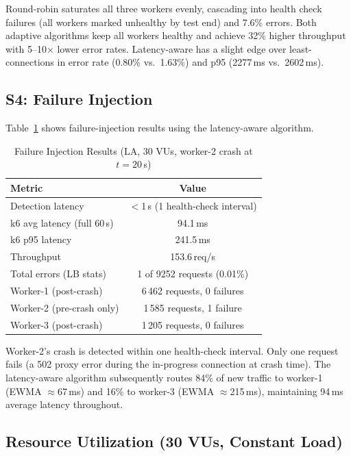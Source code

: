 \documentclass[conference]{IEEEtran}
\begin{document}
Round-robin saturates all three workers evenly, cascading into health
check failures (all workers marked unhealthy by test end) and 7.6\%
errors. Both adaptive algorithms keep all workers healthy and achieve
32\% higher throughput with 5--10$\times$ lower error rates. Latency-aware
has a slight edge over least-connections in error rate (0.80\% vs.\
1.63\%) and p95 (2277\,ms vs.\ 2602\,ms).

\subsection{S4: Failure Injection}

Table~\ref{tab:failure} shows failure-injection results using the
latency-aware algorithm.

\begin{table}[h]
\caption{Failure Injection Results (LA, 30 VUs, worker-2 crash at $t{=}20$\,s)}
\label{tab:failure}
\centering
\begin{tabular}{@{}lc@{}}
\toprule
Metric & Value \\
\midrule
Detection latency            & $<$1\,s (1 health-check interval) \\
k6 avg latency (full 60\,s)  & 94.1\,ms \\
k6 p95 latency               & 241.5\,ms \\
Throughput                   & 153.6\,req/s \\
Total errors (LB stats)      & 1 of 9252 requests (0.01\%) \\
Worker-1 (post-crash)        & 6\,462 requests, 0 failures \\
Worker-2 (pre-crash only)    & 1\,585 requests, 1 failure \\
Worker-3 (post-crash)        & 1\,205 requests, 0 failures \\
\bottomrule
\end{tabular}
\end{table}

Worker-2's crash is detected within one health-check interval. Only
one request fails (a 502 proxy error during the in-progress connection
at crash time). The latency-aware algorithm subsequently routes 84\%
of new traffic to worker-1 (EWMA $\approx$67\,ms) and 16\% to worker-3
(EWMA $\approx$215\,ms), maintaining 94\,ms average latency throughout.

\subsection{Resource Utilization (30 VUs, Constant Load)}
\end{document}
